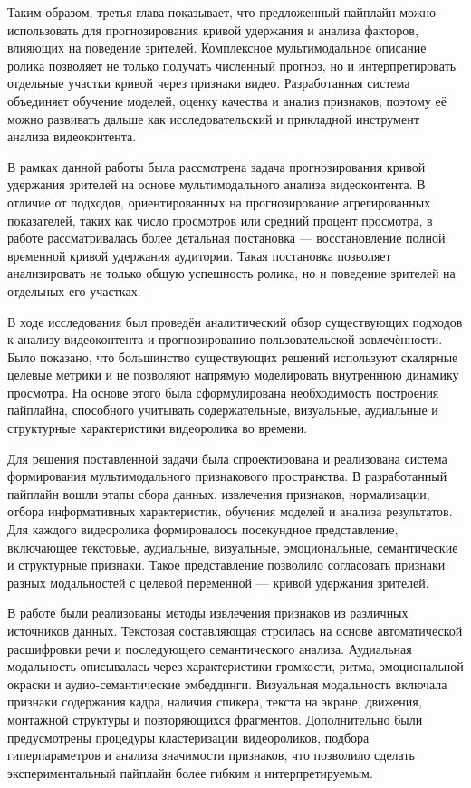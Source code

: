 \documentclass[times]{itmo-student-thesis}
\begin{document}
Таким образом, третья глава показывает, что предложенный пайплайн можно использовать для прогнозирования кривой удержания и анализа факторов, влияющих на поведение зрителей. Комплексное мультимодальное описание ролика позволяет не только получать численный прогноз, но и интерпретировать отдельные участки кривой через признаки видео. Разработанная система объединяет обучение моделей, оценку качества и анализ признаков, поэтому её можно развивать дальше как исследовательский и прикладной инструмент анализа видеоконтента.

\clearpage

\startconclusionpage

В рамках данной работы была рассмотрена задача прогнозирования кривой удержания зрителей на основе мультимодального анализа видеоконтента. В отличие от подходов, ориентированных на прогнозирование агрегированных показателей, таких как число просмотров или средний процент просмотра, в работе рассматривалась более детальная постановка — восстановление полной временной кривой удержания аудитории. Такая постановка позволяет анализировать не только общую успешность ролика, но и поведение зрителей на отдельных его участках.

В ходе исследования был проведён аналитический обзор существующих подходов к анализу видеоконтента и прогнозированию пользовательской вовлечённости. Было показано, что большинство существующих решений используют скалярные целевые метрики и не позволяют напрямую моделировать внутреннюю динамику просмотра. На основе этого была сформулирована необходимость построения пайплайна, способного учитывать содержательные, визуальные, аудиальные и структурные характеристики видеоролика во времени.

Для решения поставленной задачи была спроектирована и реализована система формирования мультимодального признакового пространства. В разработанный пайплайн вошли этапы сбора данных, извлечения признаков, нормализации, отбора информативных характеристик, обучения моделей и анализа результатов. Для каждого видеоролика формировалось посекундное представление, включающее текстовые, аудиальные, визуальные, эмоциональные, семантические и структурные признаки. Такое представление позволило согласовать признаки разных модальностей с целевой переменной — кривой удержания зрителей.

В работе были реализованы методы извлечения признаков из различных источников данных. Текстовая составляющая строилась на основе автоматической расшифровки речи и последующего семантического анализа. Аудиальная модальность описывалась через характеристики громкости, ритма, эмоциональной окраски и аудио-семантические эмбеддинги. Визуальная модальность включала признаки содержания кадра, наличия спикера, текста на экране, движения, монтажной структуры и повторяющихся фрагментов. Дополнительно были предусмотрены процедуры кластеризации видеороликов, подбора гиперпараметров и анализа значимости признаков, что позволило сделать экспериментальный пайплайн более гибким и интерпретируемым.
\end{document}
